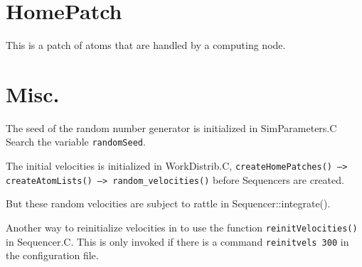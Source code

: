 \documentclass{article}
\begin{document}
\section{HomePatch}

This is a patch of atoms that are handled by a computing node.


\section{Misc.}

The seed of the random number generator is initialized in SimParameters.C
Search the variable \texttt{randomSeed}.

The initial velocities is initialized in WorkDistrib.C,
\texttt{createHomePatches() --> createAtomLists() --> random\_velocities()}
before Sequencers are created.

But these random velocities are subject to rattle in Sequencer::integrate().

Another way to reinitialize velocities in to use the function
\texttt{reinitVelocities()} in Sequencer.C.
This is only invoked if there is a command 
\texttt{reinitvels 300} in the configuration file.




%
%
\end{document}
